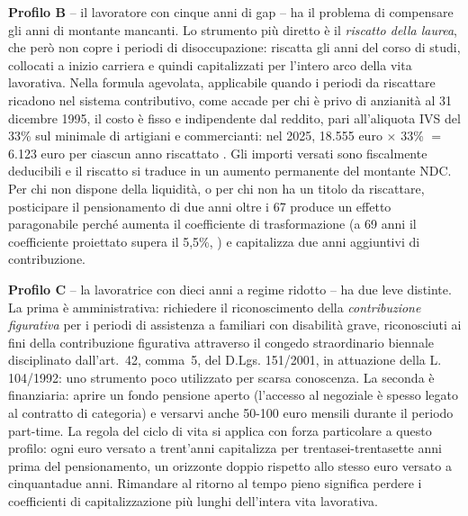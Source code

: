 \medskip
\noindent
\textbf{Profilo B} -- il lavoratore con cinque anni di gap -- ha
il problema di compensare gli anni di montante mancanti. Lo strumento
più diretto è il \emph{riscatto della laurea}, che però non copre i
periodi di disoccupazione: riscatta gli anni del corso di studi,
collocati a inizio carriera e quindi capitalizzati per l'intero arco
della vita lavorativa. Nella formula agevolata, applicabile quando i
periodi da riscattare ricadono nel sistema contributivo, come accade
per chi è privo di anzianità al 31 dicembre 1995, il costo è fisso e
indipendente dal reddito, pari all'aliquota IVS del 33\% sul minimale
di artigiani e commercianti: nel 2025, 18.555 euro $\times$ 33\% $=$
6.123 euro per ciascun anno riscattato \cite{INPSRiscattoLaurea2025}.
Gli importi versati sono fiscalmente deducibili e il riscatto si
traduce in un aumento permanente del montante NDC. Per chi non dispone
della liquidità, o per chi non ha un titolo da riscattare, posticipare
il pensionamento di due anni oltre i 67 produce un effetto paragonabile
perché aumenta il coefficiente di trasformazione (a 69 anni il
coefficiente proiettato supera il 5,5\%, \citealp{MEF_RGS2025}) e
capitalizza due anni aggiuntivi di contribuzione.

\medskip
\noindent
\textbf{Profilo C} -- la lavoratrice con dieci anni a regime ridotto
-- ha due leve distinte. La prima è amministrativa: richiedere il
riconoscimento della \emph{contribuzione figurativa} per i periodi
di assistenza a familiari con disabilità grave, riconosciuti ai fini
della contribuzione figurativa attraverso il congedo straordinario
biennale disciplinato dall'art.~42, comma~5, del D.Lgs. 151/2001, in
attuazione della L. 104/1992: uno strumento poco utilizzato per scarsa
conoscenza. La seconda è finanziaria: aprire
un fondo pensione aperto (l'accesso al negoziale è spesso legato al
contratto di categoria) e versarvi anche 50-100 euro mensili
durante il periodo part-time. La regola del ciclo di vita si applica
con forza particolare a questo profilo: ogni euro versato a
trent'anni capitalizza per trentasei-trentasette anni prima del
pensionamento, un orizzonte doppio rispetto allo stesso euro versato
a cinquantadue anni. Rimandare al ritorno al tempo pieno significa
perdere i coefficienti di capitalizzazione più lunghi dell'intera
vita lavorativa.

